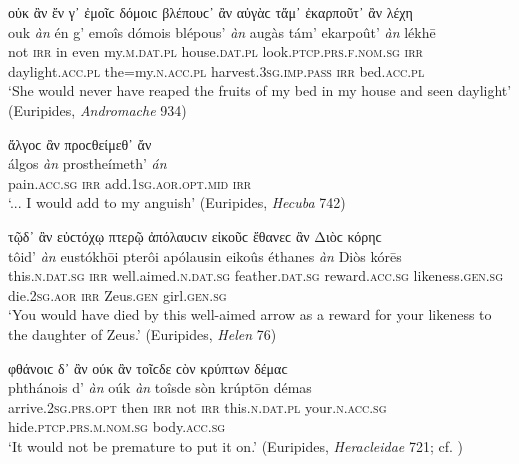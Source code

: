 \begin{exe}
\ex οὐκ ἂν ἔν γ᾽ ἐμοῖϲ δόμοιϲ βλέπουϲ᾽ ἂν αὐγὰϲ τἄμ᾽ ἐκαρποῦτ᾽ ἂν λέχη\\
\gll ouk \emph{àn} én g' emoîs dómois blépous' \emph{àn} augàs tám' ekarpoût' \emph{àn} lékhē\\
not \textsc{irr} in even my.\textsc{m.dat.pl} house.\textsc{dat.pl} look.\textsc{ptcp.prs.f.nom.sg} \textsc{irr} daylight.\textsc{acc.pl} the=my.\textsc{n.acc.pl} harvest.\textsc{3sg.imp.pass} \textsc{irr} bed.\textsc{acc.pl}\\
\trans `She would never have reaped the fruits of my bed in my house and seen daylight' (Euripides, \textit{Andromache} 934)
\label{multian26}
\end{exe}

\begin{exe}
\ex ἄλγοϲ ἂν προϲθείμεθ᾽ ἄν\\
\gll álgos \emph{àn} prostheímeth' \emph{án}\\
pain.\textsc{acc.sg} \textsc{irr} add.\textsc{1sg.aor.opt.mid} \textsc{irr}\\
\trans `... I would add to my anguish' (Euripides, \textit{Hecuba} 742)
\label{multian27}
\end{exe}

\begin{exe}
\ex τῷδ᾽ ἂν εὐϲτόχῳ πτερῷ ἀπόλαυϲιν εἰκοῦϲ ἔθανεϲ ἂν Διὸϲ κόρηϲ\\
\gll tôid' \emph{àn} eustókhōi pterôi apólausin eikoûs éthanes \emph{àn} Diòs kórēs\\
this.\textsc{n.dat.sg} \textsc{irr} well.aimed.\textsc{n.dat.sg} feather.\textsc{dat.sg} reward.\textsc{acc.sg} likeness.\textsc{gen.sg} die.\textsc{2sg.aor} \textsc{irr} Zeus.\textsc{gen} girl.\textsc{gen.sg}\\
\trans `You would have died by this well-aimed arrow as a reward for your likeness to the daughter of Zeus.' (Euripides, \textit{Helen} 76)
\label{multian28}
\end{exe}

\begin{exe}
\ex φθάνοιϲ δ᾽ ἂν ούκ ἂν τοῖϲδε ϲὸν κρύπτων δέμαϲ\\
\gll phthánois d' \emph{àn} oúk \emph{àn} toîsde sòn krúptōn démas\\
arrive.\textsc{2sg.prs.opt} then \textsc{irr} not \textsc{irr} this.\textsc{n.dat.pl} your.\textsc{n.acc.sg} hide.\textsc{ptcp.prs.m.nom.sg} body.\textsc{acc.sg}\\
\trans `It would not be premature to put it on.' (Euripides, \textit{Heracleidae} 721; cf. \citealp[119]{Elmsley1821})
\label{multian29}
\end{exe}

